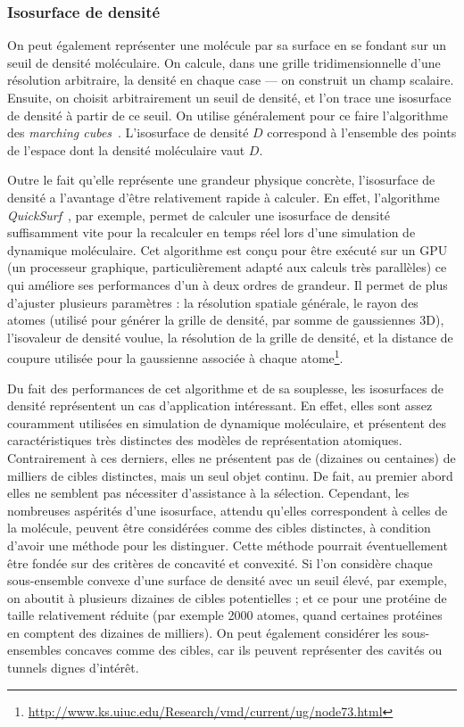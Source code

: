 \begin{appendices}
	\subsubsection{Isosurface de densité} On peut également représenter une molécule par sa surface en se fondant sur un seuil de densité moléculaire. On calcule, dans une grille tridimensionnelle d'une résolution arbitraire, la densité en chaque case --- on construit un champ scalaire. Ensuite, on choisit arbitrairement un seuil de densité, et l'on trace une isosurface de densité à partir de ce seuil. On utilise généralement pour ce faire l'algorithme des \emph{marching cubes}~\cite{lorensen1987marching}.	L'isosurface de densité $D$ correspond à l'ensemble des points de l'espace dont la densité moléculaire vaut $D$.
	
	Outre le fait qu'elle représente une grandeur physique concrète, l'isosurface de densité a l'avantage d'être relativement rapide à calculer. En effet, l'algorithme \emph{QuickSurf}~\cite{krone2012fast, roberts2013lattice, stone2013early, stone2013gpu, stone2014gpu, sener2014visualization}, par exemple, permet de calculer une isosurface de densité suffisamment vite pour la recalculer en temps réel lors d'une simulation de dynamique moléculaire. Cet algorithme est conçu pour être exécuté sur un GPU (un processeur graphique, particulièrement adapté aux calculs très parallèles) ce qui améliore ses performances d'un à deux ordres de grandeur. Il permet de plus d'ajuster plusieurs paramètres : la résolution spatiale générale, le rayon des atomes (utilisé pour générer la grille de densité, par somme de gaussiennes 3D), l'isovaleur de densité voulue, la résolution de la grille de densité, et la distance de coupure utilisée pour la gaussienne associée à chaque atome\footnote{\url{http://www.ks.uiuc.edu/Research/vmd/current/ug/node73.html}}.
	
	Du fait des performances de cet algorithme et de sa souplesse, les isosurfaces de densité représentent un cas d'application intéressant. En effet, elles sont assez couramment utilisées en simulation de dynamique moléculaire, et présentent des caractéristiques très distinctes des modèles de représentation atomiques. Contrairement à ces derniers, elles ne présentent pas de (dizaines ou centaines) de milliers de cibles distinctes, mais un seul objet continu. De fait, au premier abord elles ne semblent pas nécessiter d'assistance à la sélection. Cependant, les nombreuses aspérités d'une isosurface, attendu qu'elles correspondent à celles de la molécule, peuvent être considérées comme des cibles distinctes, à condition d'avoir une méthode pour les distinguer. Cette méthode pourrait éventuellement être fondée sur des critères de concavité et convexité. Si l'on considère chaque sous-ensemble convexe d'une surface de densité avec un seuil élevé, par exemple, on aboutit à plusieurs dizaines de cibles potentielles ; et ce pour une protéine de taille relativement réduite (par exemple 2000 atomes, quand certaines protéines en comptent des dizaines de milliers). On peut également considérer les sous-ensembles concaves comme des cibles, car ils peuvent représenter des cavités ou tunnels\footnotemark{} dignes d'intérêt.
	

\end{appendices}
